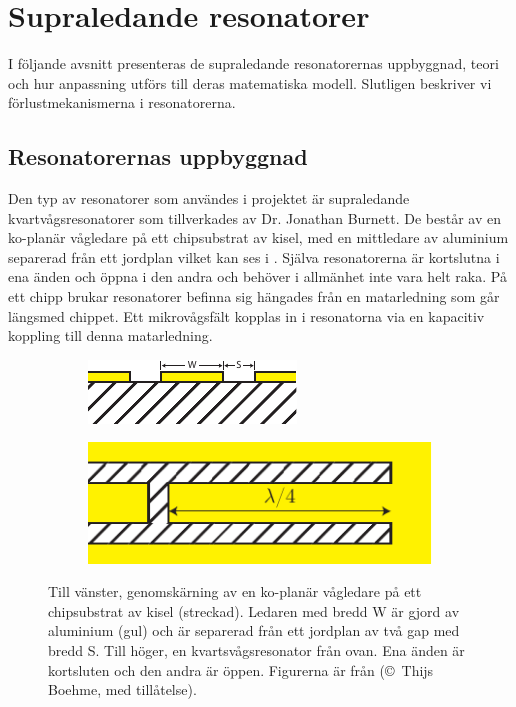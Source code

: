 \documentclass[main.tex]{subfiles}
\begin{document}
\chapter{Supraledande resonatorer}
I följande avsnitt presenteras de supraledande resonatorernas uppbyggnad, teori och hur anpassning utförs till deras matematiska modell. Slutligen beskriver vi förlustmekanismerna i resonatorerna.

\section{Resonatorernas uppbyggnad}

Den typ av resonatorer som användes i projektet är supraledande kvartvågsresonatorer som tillverkades av Dr. Jonathan Burnett. De består av en ko-planär vågledare på ett chipsubstrat av kisel, med en mittledare av aluminium separerad från ett jordplan \cite{Boehme2016} vilket kan ses i . Själva resonatorerna är kortslutna i ena änden och öppna i den andra och behöver i allmänhet inte vara helt raka. På ett chipp brukar resonatorer befinna sig hängades från en matarledning som går längsmed chippet. Ett mikrovågsfält kopplas in i resonatorna via en kapacitiv koppling till denna matarledning.

\begin{figure}[H]
\centering
\begin{subfigure}{0.45\textwidth}
  \centering
  \includegraphics[width=0.8\linewidth]{figure/chipsubstrat.pdf}
\end{subfigure}%
\begin{subfigure}{.45\textwidth}
  \centering
  \includegraphics[width=0.8\linewidth]{figure/chipsubstrat2.pdf}
\end{subfigure}
\caption{Till vänster, genomskärning av en ko-planär vågledare på ett chipsubstrat av kisel (streckad). Ledaren med bredd W är gjord av aluminium (gul) och är separerad från ett jordplan av två gap med bredd S. Till höger, en kvartsvågsresonator från ovan. Ena änden är kortsluten och den andra är öppen. Figurerna är från \cite{Boehme2016} (\copyright ~Thijs Boehme, med tillåtelse).}
\label{fig:chipsubstrat}
\end{figure}
\end{document}
